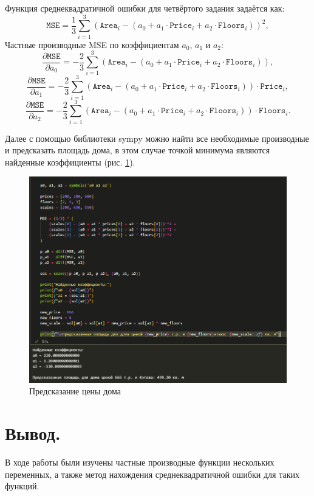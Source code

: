 \documentclass[14pt,a4paper]{extarticle}
\begin{document}
Функция среднеквадратичной ошибки для четвёртого задания задаётся как:
\[
\mathtt{MSE} = \frac{1}{3} \sum_{i=1}^3 \left( \mathtt{Area}_i - (a_0 + a_1 \cdot \mathtt{Price}_i + a_2 \cdot \mathtt{Floors}_i) \right)^2,
\]
Частные производные MSE по коэффициентам $a_0$, $a_1$ и $a_2$:
\[
\frac{\partial \mathtt{MSE}}{\partial a_0} = -\frac{2}{3} \sum_{i=1}^3 \left( \mathtt{Area}_i - (a_0 + a_1 \cdot \mathtt{Price}_i + a_2 \cdot \mathtt{Floors}_i) \right),
\]
\[
\frac{\partial \mathtt{MSE}}{\partial a_1} = -\frac{2}{3} \sum_{i=1}^3 \left( \mathtt{Area}_i - (a_0 + a_1 \cdot \mathtt{Price}_i + a_2 \cdot \mathtt{Floors}_i) \right) \cdot \mathtt{Price}_i,
\]
\[
\frac{\partial \mathtt{MSE}}{\partial a_2} = -\frac{2}{3} \sum_{i=1}^3 \left( \mathtt{Area}_i - (a_0 + a_1 \cdot \mathtt{Price}_i + a_2 \cdot \mathtt{Floors}_i) \right) \cdot \mathtt{Floors}_i.
\]

Далее с помощью библиотеки sympy можно найти все необходимые
производные и предсказать площадь дома,
в этом случае точкой минимума являются найденные коэффициенты (рис. \ref{pic:house}).

\begin{figure}[ht!]
    \centering
    \includegraphics[width=0.66\linewidth]{figures/4.png}
    \caption{Предсказание цены дома}
    \label{pic:house}
\end{figure}

\section*{Вывод.}

В ходе работы были изучены частные производные функции нескольких переменных,
а также метод нахождения среднеквадратичной ошибки для таких функций.
\end{document}
